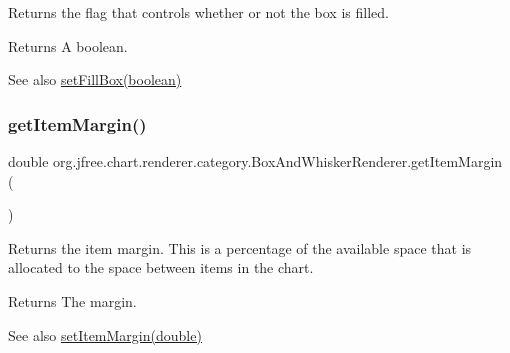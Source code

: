 Returns the flag that controls whether or not the box is filled.

\begin{DoxyReturn}{Returns}
A boolean.
\end{DoxyReturn}
\begin{DoxySeeAlso}{See also}
\mbox{\hyperlink{classorg_1_1jfree_1_1chart_1_1renderer_1_1category_1_1_box_and_whisker_renderer_ae5b3547e344c41775f7029a29807a36b}{set\+Fill\+Box(boolean)}} 
\end{DoxySeeAlso}
\mbox{\label{classorg_1_1jfree_1_1chart_1_1renderer_1_1category_1_1_box_and_whisker_renderer_aa684d8b009be8e363506f9524df5acc5}} 
\subsubsection{\texorpdfstring{get\+Item\+Margin()}{getItemMargin()}}
{\footnotesize\ttfamily double org.\+jfree.\+chart.\+renderer.\+category.\+Box\+And\+Whisker\+Renderer.\+get\+Item\+Margin (\begin{DoxyParamCaption}{ }\end{DoxyParamCaption})}

Returns the item margin. This is a percentage of the available space that is allocated to the space between items in the chart.

\begin{DoxyReturn}{Returns}
The margin.
\end{DoxyReturn}
\begin{DoxySeeAlso}{See also}
\mbox{\hyperlink{classorg_1_1jfree_1_1chart_1_1renderer_1_1category_1_1_box_and_whisker_renderer_a24d502fe9b73213ec22790d5c52c86b7}{set\+Item\+Margin(double)}} 
\end{DoxySeeAlso}
\mbox{\label{classorg_1_1jfree_1_1chart_1_1renderer_1_1category_1_1_box_and_whisker_renderer_a4bcc61984760a07622e11a734aa835e3}} 
